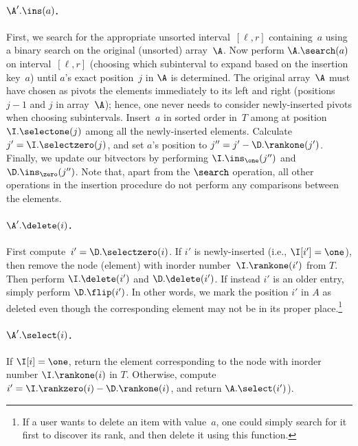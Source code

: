 \paragraph{$\A'.\ins(a)$.} First, we search for the appropriate unsorted interval~$[\ell,r]$ containing~$a$ using a binary search on the original (unsorted) array~$\A$.
Now perform $\A.\search(a)$ on interval~$[\ell,r]$ (choosing which subinterval 
to expand based on the insertion key~$a$) until $a$'s exact position~$j$ in 
$\A$ is determined. The original array~$\A$ must have chosen as pivots the 
elements immediately to its left and right (positions~$j-1$ and $j$ in array~$\A$); 
hence, one never needs to consider newly-inserted pivots when choosing subintervals.
Insert~$a$ in sorted order in~$T$ among at position $\I.\selectone(j)$ among 
all the newly-inserted elements.  Calculate $j'=\I.\selectzero(j)$, and set $a$'s 
position to $j''=j'-\D.\rankone(j')$. Finally, we update our bitvectors by 
performing $\I.\ins_\one(j'')$ and $\D.\ins_\zero(j'')$.
Note that, apart from the $\search$ operation, all other operations in the 
insertion procedure do not perform any comparisons between the elements.

\paragraph{$\A'.\delete(i)$.} First compute~$i'=\D.\selectzero(i)$. 
If $i'$ is newly-inserted (i.e., $\I[i'] = \one$), then remove the node 
(element) with inorder number~$\I.\rankone(i')$ from $T$.
Then perform $\I.\delete(i')$ and $\D.\delete(i')$. 
If instead $i'$ is an older entry, 
simply perform $\D.\flip(i')$. In other words, 
we mark the position $i'$ in $A$ as deleted even though the corresponding 
element may not be in its proper place.\footnote{If a user wants to 
delete an item with value~$a$, one could simply search for it first to 
discover its rank, and then delete it using this function.}


\paragraph{$\A'.\select(i)$.} If $\I[i] = \one$, return the element 
corresponding to the node with inorder number $\I.\rankone(i)$ 
in $T$. Otherwise, compute $i'=\I.\rankzero(i)-\D.\rankone(i)$, 
and return $\A.\select(i')$).


